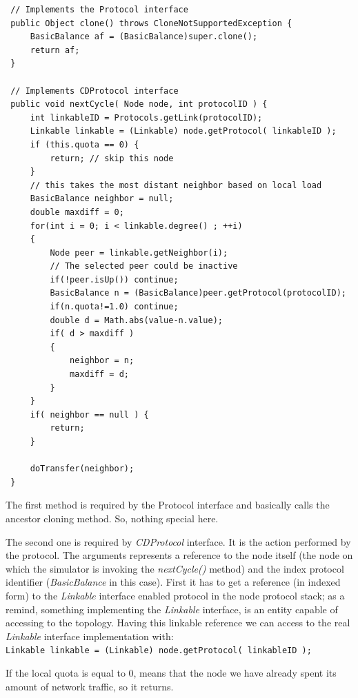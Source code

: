 \documentclass[a4paper,12pt]{article}
\begin{document}
\footnotesize
\begin{verbatim}
 // Implements the Protocol interface
 public Object clone() throws CloneNotSupportedException {
     BasicBalance af = (BasicBalance)super.clone();
     return af;
 }
 
 // Implements CDProtocol interface
 public void nextCycle( Node node, int protocolID ) {
     int linkableID = Protocols.getLink(protocolID);
     Linkable linkable = (Linkable) node.getProtocol( linkableID );
     if (this.quota == 0) {
         return; // skip this node
     }    
     // this takes the most distant neighbor based on local load
     BasicBalance neighbor = null;
     double maxdiff = 0;
     for(int i = 0; i < linkable.degree() ; ++i)
     {
         Node peer = linkable.getNeighbor(i);
         // The selected peer could be inactive
         if(!peer.isUp()) continue; 
         BasicBalance n = (BasicBalance)peer.getProtocol(protocolID);
         if(n.quota!=1.0) continue;
         double d = Math.abs(value-n.value);
         if( d > maxdiff )
         {
             neighbor = n;
             maxdiff = d;
         }
     }
     if( neighbor == null ) {
         return;
     }
                 
     doTransfer(neighbor);
 }
\end{verbatim}
\normalsize


The first method is required by the Protocol interface and basically
calls the ancestor cloning method. So, nothing special here.

The second one is required by \emph{CDProtocol} interface. It is the
action performed by the protocol. The arguments represents a reference
to the node itself (the node on which the simulator is invoking the
\emph{nextCycle()} method) and the index protocol identifier (\emph{BasicBalance}
in this case). First it has to get a reference (in indexed form) to
the \emph{Linkable} interface enabled protocol in the node protocol
stack; as a remind, something implementing the \emph{Linkable} interface,
is an entity capable of accessing to the topology. Having this linkable
reference we can access to the real \emph{Linkable} interface
implementation with: \\


\texttt{\footnotesize Linkable linkable = (Linkable) node.getProtocol(
linkableID );}~\\
{\footnotesize \par}

If the local quota is equal to 0, means that the node we have already
spent its amount of network traffic, so it returns.
\end{document}
